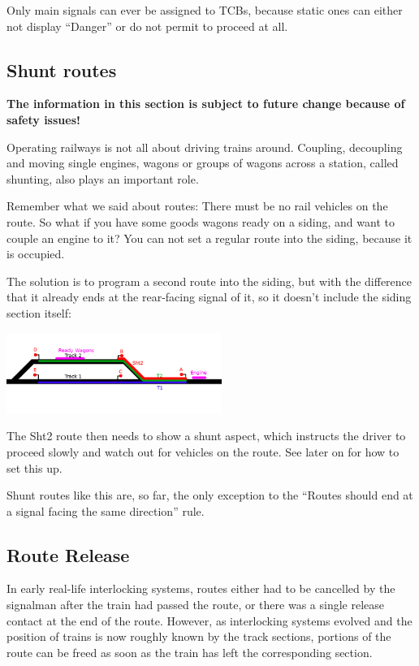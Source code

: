 \documentclass[english]{paper}
\begin{document}
Only main signals can ever be assigned to TCBs, because static ones
can either not display ``Danger'' or do not permit to proceed at
all.

\subsection{Shunt routes}

\textbf{The information in this section is subject to future change
because of safety issues!}

Operating railways is not all about driving trains around. Coupling,
decoupling and moving single engines, wagons or groups of wagons across
a station, called shunting, also plays an important role.

Remember what we said about routes: There must be no rail vehicles
on the route. So what if you have some goods wagons ready on a siding,
and want to couple an engine to it? You can not set a regular route
into the siding, because it is occupied.

The solution is to program a second route into the siding, but with
the difference that it already ends at the rear-facing signal of it,
so it doesn't include the siding section itself:

\includegraphics[width=7cm]{9_home_moritz_Home_Projekte_Minetest_minetest_mods_advtrains_assets_lyx_img_route_ex3.png}

The Sht2 route then needs to show a shunt aspect, which instructs
the driver to proceed slowly and watch out for vehicles on the route.
See later on for how to set this up.

Shunt routes like this are, so far, the only exception to the ``Routes
should end at a signal facing the same direction'' rule.

\subsection{Route Release}

In early real-life interlocking systems, routes either had to be cancelled
by the signalman after the train had passed the route, or there was
a single release contact at the end of the route. However, as interlocking
systems evolved and the position of trains is now roughly known by
the track sections, portions of the route can be freed as soon as
the train has left the corresponding section.
\end{document}
